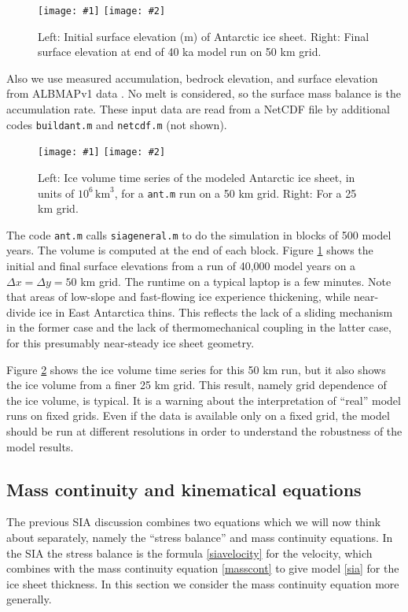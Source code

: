 \documentclass[titlepage,a4paper,final,12pt]{scrartcl}
\newcommand{\twofigsizes}[5]{
\begin{figure}[ht]
\centering
\texttt{[image: \#1]} \quad
\texttt{[image: \#2]}
\caption{#3}
\label{fig:#1}
\end{figure}}
\newcommand{\twofig}[3]{\twofigsizes{#1}{#2}{#3}{2.5in}{2.5in}}
\begin{document}
\twofigsizes{antinitial}{antfinal}{Left: Initial surface elevation (m) of Antarctic ice sheet.  Right: Final surface elevation at end of 40 ka model run on 50 km grid.}{2.55in}{3.2in}

Also we use measured accumulation, bedrock elevation, and surface elevation from ALBMAPv1 data \cite{LeBrocqetal2010}.  No melt is considered, so the surface mass balance is the accumulation rate.  These input data are read from a NetCDF file by additional codes \texttt{buildant.m} and \texttt{netcdf.m} (not shown).

\twofig{antvol}{antvol25km}{Left: Ice volume time series of the modeled Antarctic ice sheet, in units of $10^6 \, \text{km}^3$, for a \texttt{ant.m} run on a 50 km grid.  Right:  For a 25 km grid.}

The code \texttt{ant.m} calls \texttt{siageneral.m} to do the simulation in blocks of 500 model years.  The volume is computed at the end of each block.  Figure \ref{fig:antinitial} shows the initial and final surface elevations from a run of 40,000 model years on a $\Delta x = \Delta y = 50$ km grid.  The runtime on a typical laptop is a few minutes.  Note that areas of low-slope and fast-flowing ice experience thickening, while near-divide ice in East Antarctica thins.  This reflects the lack of a sliding mechanism in the former case and the lack of thermomechanical coupling in the latter case, for this presumably near-steady ice sheet geometry.

Figure \ref{fig:antvol} shows the ice volume time series for this 50 km run, but it also shows the ice volume from a finer 25 km grid.  This result, namely grid dependence of the ice volume, is typical.  It is a warning about the interpretation of ``real'' model runs on fixed grids.  Even if the data is available only on a fixed grid, the model should be run at different resolutions in order to understand the robustness of the model results.


\subsection{Mass continuity and kinematical equations}

The previous SIA discussion combines two equations which we will now think about separately, namely the ``stress balance'' and mass continuity equations.  In the SIA the stress balance is the formula \eqref{siavelocity} for the velocity, which combines with the mass continuity equation \eqref{masscont} to give model \eqref{sia} for the ice sheet thickness.  In this section we consider the mass continuity equation more generally.
\end{document}
